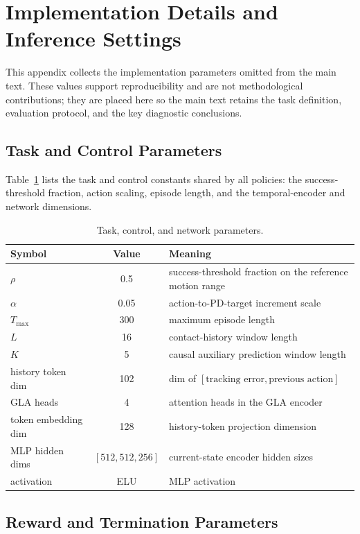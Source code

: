 \documentclass{llmxive}
\begin{document}
\section{Implementation Details and Inference Settings}
\label{app:impl}

This appendix collects the implementation parameters omitted from
the main text. These values support reproducibility and are not
methodological contributions; they are placed here so the main text
retains the task definition, evaluation protocol, and the key
diagnostic conclusions.


\subsection{Task and Control Parameters}
\label{app:taskhp}

Table~\ref{tab:taskhp} lists the task and control constants shared by
all policies: the success-threshold fraction, action scaling, episode
length, and the temporal-encoder and network dimensions.

\begin{table}[ht]
\centering
\small
\begin{tabular}{lcl}
\toprule
Symbol & Value & Meaning \\
\midrule
$\rho$ & 0.5 & success-threshold fraction on the reference motion range \\
$\alpha$ & 0.05 & action-to-PD-target increment scale \\
$T_{\max}$ & 300 & maximum episode length \\
$L$ & 16 & contact-history window length \\
$K$ & 5 & causal auxiliary prediction window length \\
history token dim & 102 & dim of $[\text{tracking error}, \text{previous action}]$ \\
GLA heads & 4 & attention heads in the GLA encoder \\
token embedding dim & 128 & history-token projection dimension \\
MLP hidden dims & $[512,512,256]$ & current-state encoder hidden sizes \\
activation & ELU & MLP activation \\
\bottomrule
\end{tabular}
\caption{Task, control, and network parameters.}
\label{tab:taskhp}
\end{table}


\subsection{Reward and Termination Parameters}
\label{app:rewhp}
\end{document}

